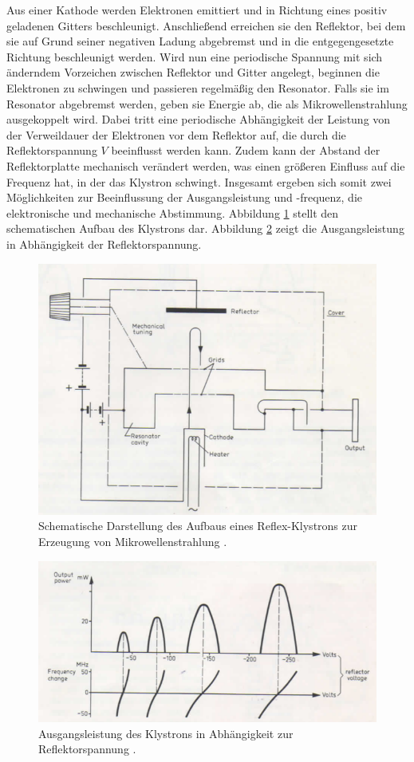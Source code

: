 Aus einer Kathode werden Elektronen emittiert und in Richtung eines positiv
geladenen Gitters beschleunigt.
Anschließend erreichen sie den Reflektor, bei dem sie auf Grund seiner
negativen Ladung abgebremst und in die entgegengesetzte Richtung beschleunigt
werden.
Wird nun eine periodische Spannung mit sich änderndem Vorzeichen zwischen
Reflektor und Gitter angelegt, beginnen die Elektronen zu schwingen und
passieren regelmäßig den Resonator.
Falls sie im Resonator abgebremst werden, geben sie Energie ab, die als
Mikrowellenstrahlung ausgekoppelt wird.
Dabei tritt eine periodische Abhängigkeit der Leistung
von der Verweildauer der Elektronen vor dem Reflektor auf, die durch die
Reflektorspannung $V$ beeinflusst werden kann.
Zudem kann der Abstand der Reflektorplatte mechanisch verändert werden,
was einen größeren Einfluss auf die Frequenz hat, in der das Klystron schwingt.
Insgesamt ergeben sich somit zwei Möglichkeiten zur Beeinflussung der
Ausgangsleistung und -frequenz, die elektronische und mechanische Abstimmung.
Abbildung \ref{fig:aufbau} stellt den schematischen Aufbau des Klystrons dar.
Abbildung \ref{fig:output} zeigt die Ausgangsleistung in Abhängigkeit der
Reflektorspannung.
\begin{figure}[p]
    \centering
    \includegraphics[width=0.9\linewidth]{img/aufbau.png}
    \caption{
        Schematische Darstellung des Aufbaus eines Reflex-Klystrons
        zur Erzeugung von Mikrowellenstrahlung \cite{V53}.
    }
    \label{fig:aufbau}
\end{figure}
\begin{figure}[p]
    \centering
    \includegraphics[width=0.9\linewidth]{img/output.png}
    \caption{
        Ausgangsleistung des Klystrons in Abhängigkeit zur Reflektorspannung
        \cite{V53}.
    }
    \label{fig:output}
\end{figure}
\clearpage

